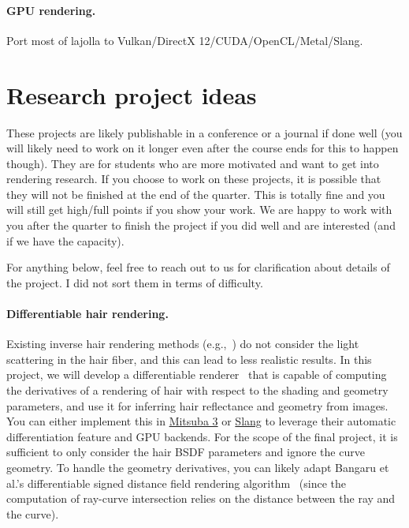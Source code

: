 \paragraph{GPU rendering.}
Port most of lajolla to Vulkan/DirectX 12/CUDA/OpenCL/Metal/Slang.

\section{Research project ideas}
These projects are likely publishable in a conference or a journal if done well (you will likely need to work on it longer even after the course ends for this to happen though).
They are for students who are more motivated and want to get into rendering research.
If you choose to work on these projects, it is possible that they will not be finished at the end of the quarter. This is totally fine and you will still get high/full points if you show your work.
We are happy to work with you after the quarter to finish the project if you did well and are interested (and if we have the capacity).

For anything below, feel free to reach out to us for clarification about details of the project.
I did not sort them in terms of difficulty.

\paragraph{Differentiable hair rendering.}
Existing inverse hair rendering methods (e.g.,~\cite{Rosu:2022:NSL}) do not consider the light scattering in the hair fiber, and this can lead to less realistic results.
In this project, we will develop a differentiable renderer~\cite{Li:2018:DMC} that is capable of computing the derivatives of a rendering of hair with respect to the shading and geometry parameters, and use it for inferring hair reflectance and geometry from images.
You can either implement this in \href{https://github.com/mitsuba-renderer/mitsuba3}{Mitsuba 3} or \href{https://developer.nvidia.com/blog/differentiable-slang-example-applications/}{Slang} to leverage their automatic differentiation feature and GPU backends.
For the scope of the final project, it is sufficient to only consider the hair BSDF parameters and ignore the curve geometry.
To handle the geometry derivatives, you can likely adapt Bangaru et al.'s differentiable signed distance field rendering algorithm~\cite{Bangaru:2022:DRN} (since the computation of ray-curve intersection relies on the distance between the ray and the curve).

